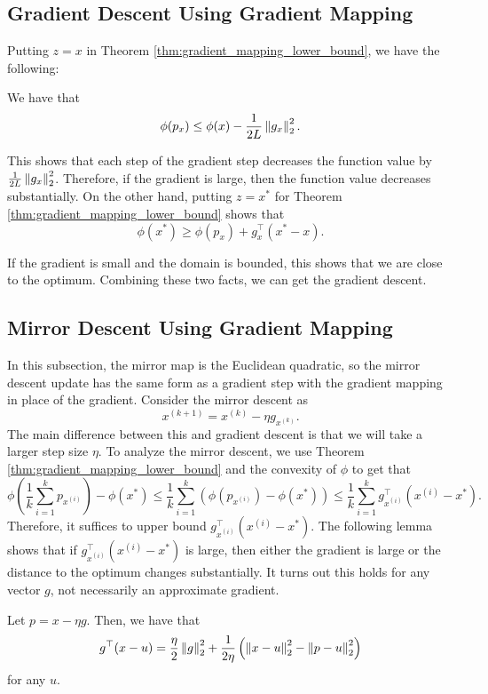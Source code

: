 \subsection{Gradient Descent Using Gradient Mapping}

Putting $z=x$ in Theorem \ref{thm:gradient_mapping_lower_bound},
we have the following:
\begin{lem}
\label{lem:gradient_descent_lemma}We have that
\[
\phi(p_{x})\leq\phi(x)-\frac{1}{2L}\left\Vert g_{x}\right\Vert^{2}_{2}.
\]
\end{lem}

This shows that each step of the gradient step decreases the function
value by $\frac{1}{2L}\left\Vert g_{x}\right\Vert^{2}_{2}$. Therefore, if the gradient
is large, then the function value decreases substantially. On the
other hand, putting $z=x^{*}$ for Theorem \ref{thm:gradient_mapping_lower_bound}
shows that
\[
\phi(x^{*})\geq\phi(p_{x})+g^{\top}_{x}(x^{*}-x).
\]

If the gradient is small and the domain is bounded, this shows that
we are close to the optimum. Combining these two facts, we can get
the gradient descent.

\subsection{Mirror Descent Using Gradient Mapping}

In this subsection, the mirror map is the Euclidean quadratic, so
the mirror descent update has the same form as a gradient step with
the gradient mapping in place of the gradient. Consider the mirror
descent as
\begin{equation}
x^{(k+1)}=x^{(k)}-\eta g_{x^{(k)}}.\label{eq:mirror_step}
\end{equation}
The main difference between this and gradient descent is that we will
take a larger step size $\eta$. To analyze the mirror descent, we
use Theorem \ref{thm:gradient_mapping_lower_bound} and the convexity
of $\phi$ to get that
\begin{equation}
\phi(\frac{1}{k}\sum^{k}_{i=1}p_{x^{(i)}})-\phi(x^{*})\leq\frac{1}{k}\sum^{k}_{i=1}(\phi(p_{x^{(i)}})-\phi(x^{*}))\leq\frac{1}{k}\sum^{k}_{i=1}g^{\top}_{x^{(i)}}(x^{(i)}-x^{*}).\label{eq:mirror_lemma}
\end{equation}
Therefore, it suffices to upper bound $g^{\top}_{x^{(i)}}(x^{(i)}-x^{*})$.
The following lemma shows that if $g^{\top}_{x^{(i)}}(x^{(i)}-x^{*})$
is large, then either the gradient is large or the distance to the
optimum changes substantially. It turns out this holds for any vector
$g$, not necessarily an approximate gradient.
\begin{lem}
\label{lem:mirror_step}Let $p=x-\eta g$. Then, we have that
\[
g^{\top}(x-u)=\frac{\eta}{2}\left\Vert g\right\Vert^{2}_{2}+\frac{1}{2\eta}\left(\left\Vert x-u\right\Vert^{2}_{2}-\left\Vert p-u\right\Vert^{2}_{2}\right)
\]
for any $u$.
\end{lem}



